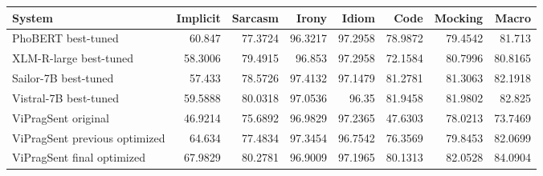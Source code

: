 \begin{tabular}{lrrrrrrr}
System & Implicit & Sarcasm & Irony & Idiom & Code & Mocking & Macro \\
\hline
PhoBERT best-tuned & 60.847 & 77.3724 & 96.3217 & 97.2958 & 78.9872 & 79.4542 & 81.713 \\
XLM-R-large best-tuned & 58.3006 & 79.4915 & 96.853 & 97.2958 & 72.1584 & 80.7996 & 80.8165 \\
Sailor-7B best-tuned & 57.433 & 78.5726 & 97.4132 & 97.1479 & 81.2781 & 81.3063 & 82.1918 \\
Vistral-7B best-tuned & 59.5888 & 80.0318 & 97.0536 & 96.35 & 81.9458 & 81.9802 & 82.825 \\
ViPragSent original & 46.9214 & 75.6892 & 96.9829 & 97.2365 & 47.6303 & 78.0213 & 73.7469 \\
ViPragSent previous optimized & 64.634 & 77.4834 & 97.3454 & 96.7542 & 76.3569 & 79.8453 & 82.0699 \\
ViPragSent final optimized & 67.9829 & 80.2781 & 96.9009 & 97.1965 & 80.1313 & 82.0528 & 84.0904 \\
\end{tabular}

